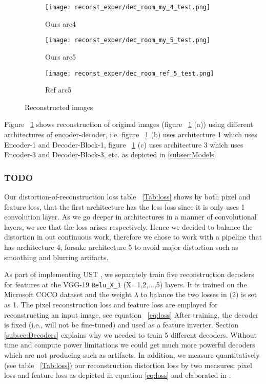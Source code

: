 \begin{figure}[H]
\begin{subfigure}[b]{0.13\linewidth}
		\texttt{[image: reconst\_exper/dec\_room\_my\_4\_test.png]} %
		\caption{Ours arc4}
	\end{subfigure}
	\begin{subfigure}[b]{0.13\linewidth}
		\texttt{[image: reconst\_exper/dec\_room\_my\_5\_test.png]} %
		\caption{Ours arc5}
	\end{subfigure}
	\begin{subfigure}[b]{0.13\linewidth}
		\texttt{[image: reconst\_exper/dec\_room\_ref\_5\_test.png]} %
		\caption{Ref arc5}	
	\end{subfigure}
	\caption{Reconstructed images}
	\label{fig:reconstruction}
\end{figure}
Figure ~\ref{fig:reconstruction} shows reconstruction of original images (figure ~\ref{fig:reconstruction} (a)) using different architectures of encoder-decoder, i.e. figure ~\ref{fig:reconstruction} (b) uses architecture 1 which uses Encoder-1 and Decoder-Block-1, figure ~\ref{fig:reconstruction} (c) uses architecture 3 which uses Encoder-3 and Decoder-Block-3, etc. as depicted in \ref{subsec:Models}.

\subsubsection{TODO}
Our distortion-of-reconstruction loss table ~\ref{Tab:loss} shows by both pixel and feature loss, that the first architecture has the less loss since it is only uses 1 convolution layer. As we go deeper in architectures in a manner of convolutional layers, we see that the loss arises respectively. Hence we decided to balance the distortion in out continuous work, therefore we chose to work with a pipeline that has architecture 4, forsake architecture 5 to avoid major distortion such as smoothing and blurring artifacts.

As part of implementing UST \cite{bib11}, we separately train five reconstruction decoders for features
at the VGG-19 \verb|Relu_X_1| (X=1,2,...,5) layers. It is trained on the Microsoft COCO dataset \cite{bib10} and
the weight $\lambda$ to balance the two losses in (2) is set as 1.
The pixel reconstruction loss \cite{bib22} and feature loss \cite{bib22, bib17} are employed for reconstructing an input image, see equation ~\ref{eq:loss}
After training, the decoder is fixed (i.e., will not be fine-tuned) and used as a feature inverter.\newline
Section \ref{subsec:Decoders} explains why we needed to train 5 different decoders. Without time and compute power limitations we could get much more powerful decoders which are not producing such as artifacts.
In addition, we measure quantitatively (see table ~\ref{Tab:loss}) our reconstruction distortion loss by two measures: pixel loss and feature loss as depicted in equation \ref{eq:loss} and elaborated in \cite{bib22, bib17}.\newline\\


